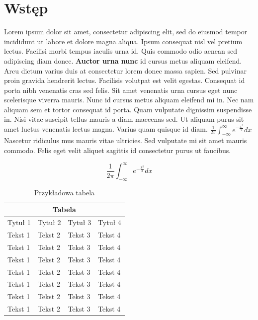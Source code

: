 \documentclass[12pt]{article}
\begin{document}
\newpage
\section{Wstęp}
Lorem ipsum dolor sit amet, consectetur adipiscing elit, sed do eiusmod tempor incididunt ut labore et dolore magna aliqua. Ipsum consequat nisl vel pretium lectus. Facilisi morbi tempus iaculis urna id. Quis commodo odio aenean sed adipiscing diam donec. \textbf{Auctor urna nunc} id cursus metus aliquam eleifend. Arcu dictum varius duis at consectetur lorem donec massa sapien. Sed pulvinar proin gravida hendrerit lectus. Facilisis volutpat est velit egestas. Consequat id porta nibh venenatis cras sed felis. Sit amet venenatis urna cursus eget nunc scelerisque viverra mauris. Nunc id cursus metus aliquam eleifend mi in. Nec nam aliquam sem et tortor consequat id porta. Quam vulputate dignissim suspendisse in. Nisi vitae suscipit tellus mauris a diam maecenas sed. Ut aliquam purus sit amet luctus venenatis lectus magna. Varius quam quisque id diam. $\frac{1}{2\pi}\int_{-\infty}^{\infty}e^{-\frac{x^2}{2}}dx$ Nascetur ridiculus mus mauris vitae ultricies. Sed vulputate mi sit amet mauris commodo. Felis eget velit aliquet sagittis id consectetur purus ut faucibus.

$$\frac{1}{2\pi}\int_{-\infty}^{\infty}e^{-\frac{x^2}{2}}dx$$
\begin{table}[h]
\begin{center}
    

\begin{tabular}{ |p{3cm}||p{3cm}|p{3cm}|p{3cm}|  }
 \hline
 \multicolumn{4}{|c|}{Tabela} \\
 \hline
 Tytuł 1 & Tytuł 2 & Tytuł 3 & Tytuł 4\\
 \hline
 Tekst 1 & Tekst 2 & Tekst 3 & Tekst 4\\
 Tekst 1 & Tekst 2 & Tekst 3 & Tekst 4\\
 Tekst 1 & Tekst 2 & Tekst 3 & Tekst 4\\
 Tekst 1 & Tekst 2 & Tekst 3 & Tekst 4\\
 Tekst 1 & Tekst 2 & Tekst 3 & Tekst 4\\
 Tekst 1 & Tekst 2 & Tekst 3 & Tekst 4\\
 Tekst 1 & Tekst 2 & Tekst 3 & Tekst 4\\
 \hline
\end{tabular}
\caption{Przykładowa tabela}
\label{tab1}
\end{center}
\end{table}
\end{document}
